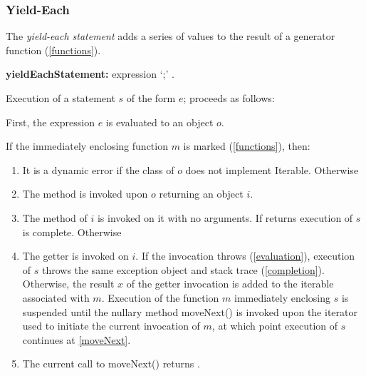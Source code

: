 \documentclass{article}
\newcommand{\code}[1]{{\sf #1}}
\begin{document}
 \subsubsection{ Yield-Each}

\LMHash{}
 The {\em yield-each statement} adds a series of values to the result of a generator function (\ref{functions}).

 \begin{grammar}
{\bf yieldEachStatement:}
   \YIELD* expression `{\escapegrammar ;}'
      .
\end{grammar}

\LMHash{}
Execution of a statement $s$ of the form \code{\YIELD* $e$;}  proceeds as follows:

\LMHash{}
First, the expression $e$ is evaluated to an object $o$.

\LMHash{}
If the immediately enclosing function $m$ is marked \SYNC* (\ref{functions}), then:
\begin{enumerate}
\item It is a dynamic error if the class of $o$ does not implement \code{Iterable}.  Otherwise
\item The method  is invoked upon $o$ returning an object $i$.
\item \label{moveNext} The  method of $i$ is invoked on it with no arguments. If  returns \FALSE{} execution of $s$ is complete. Otherwise
\item The getter  is invoked on $i$. If the invocation throws (\ref{evaluation}), execution of $s$ throws the same exception object and stack trace (\ref{completion}). Otherwise, the result $x$ of the getter invocation is added to the iterable associated with $m$.
Execution of the function $m$ immediately enclosing $s$ is suspended until the nullary method \code{moveNext()} is invoked upon the iterator used to initiate the current invocation of $m$, at which point execution of $s$ continues at \ref{moveNext}.
\item
The current call to \code{moveNext()} returns \TRUE.
\end{enumerate}
\end{document}
